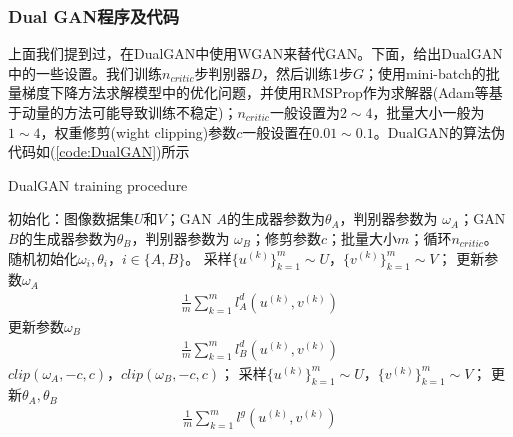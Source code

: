         \subsubsection{Dual GAN程序及代码}
            \par
            上面我们提到过，在DualGAN中使用WGAN来替代GAN。下面，给出DualGAN中的一些设置。我们训练$n_{critic}$步判别器$D$，然后训练1步$G$；使用mini-batch的批量梯度下降方法求解模型中的优化问题，并使用RMSProp作为求解器(Adam等基于动量的方法可能导致训练不稳定)；$n_{critic}$一般设置为$2\sim 4$，批量大小一般为$1\sim 4$，权重修剪(wight clipping)参数$c$一般设置在$0.01\sim 0.1$。DualGAN的算法伪代码如(\ref{code:DualGAN})所示
            \begin{algorithm}[H]
                \caption{DualGAN training procedure}\label{code:DualGAN}
                \begin{algorithmic}[1]
                    \State 初始化：图像数据集$U$和$V$；GAN $A$的生成器参数为$\theta_A$，判别器参数为 $\omega_A$；GAN $B$的生成器参数为$\theta_B$，判别器参数为 $\omega_B$；修剪参数$c$；批量大小$m$；循环$n_{critic}$。
                    \State 随机初始化$\omega_i,\theta_i$，$i\in \{A,B\}$。
                            \State 采样$\{u^{(k)}\}_{k=1}^m\sim U$，$\{v^{(k)}\}_{k=1}^m\sim V$；
                            \State 更新参数$\omega_A$
                            \begin{align*}
                            \frac{1}{m} \sum_{k=1}^m l_A^d ( u^{(k)},v^{(k)} )
                            \end{align*}
                            \State 更新参数$\omega_B$
                            \begin{align*}
                            \frac{1}{m} \sum_{k=1}^m l_B^d ( u^{(k)},v^{(k)} )
                            \end{align*}
                            \State $clip(\omega_A,-c,c)$，$clip(\omega_B,-c,c)$；
                        \EndFor
                        \State 采样$\{u^{(k)}\}_{k=1}^m\sim U$，$\{v^{(k)}\}_{k=1}^m\sim V$；
                        \State 更新$\theta_A,\theta_B$
                        \begin{align*}
                        \frac{1}{m} \sum_{k=1}^m l^g ( u^{(k)},v^{(k)} )
                        \end{align*}
                    \EndWhile
                \end{algorithmic}
            \end{algorithm}
